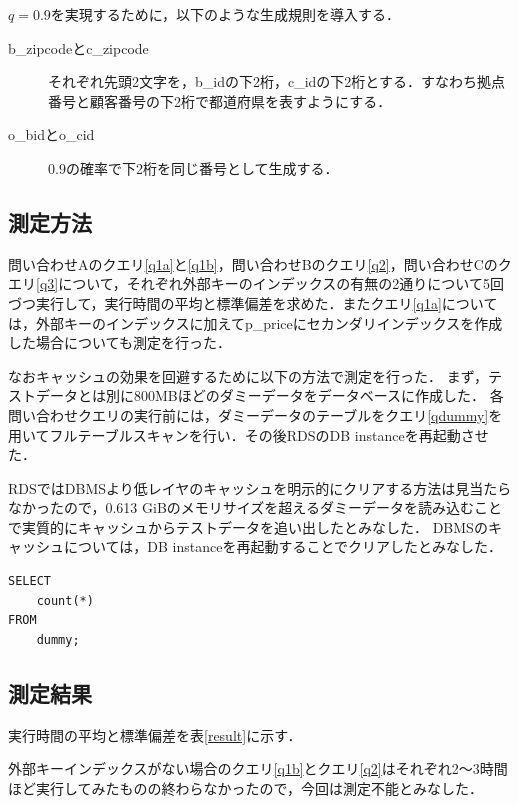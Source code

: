 \documentclass{jsarticle}
\begin{document}
$ q = 0.9 $を実現するために，以下のような生成規則を導入する．
\begin{description}
  \item[b\_zipcodeとc\_zipcode] それぞれ先頭2文字を，b\_idの下2桁，c\_idの下2桁とする．すなわち拠点番号と顧客番号の下2桁で都道府県を表すようにする．
  \item[o\_bidとo\_cid] $ 0.9 $の確率で下2桁を同じ番号として生成する．
\end{description}

\subsection{測定方法}
問い合わせAのクエリ\ref{q1a}と\ref{q1b}，問い合わせBのクエリ\ref{q2}，問い合わせCのクエリ\ref{q3}について，それぞれ外部キーのインデックスの有無の2通りについて5回づつ実行して，実行時間の平均と標準偏差を求めた．またクエリ\ref{q1a}については，外部キーのインデックスに加えてp\_priceにセカンダリインデックスを作成した場合についても測定を行った．

なおキャッシュの効果を回避するために以下の方法で測定を行った．
まず，テストデータとは別に800MBほどのダミーデータをデータベースに作成した．
各問い合わせクエリの実行前には，ダミーデータのテーブルをクエリ\ref{qdummy}を用いてフルテーブルスキャンを行い．その後RDSのDB instanceを再起動させた．

RDSではDBMSより低レイヤのキャッシュを明示的にクリアする方法は見当たらなかったので，0.613 GiBのメモリサイズを超えるダミーデータを読み込むことで実質的にキャッシュからテストデータを追い出したとみなした．
DBMSのキャッシュについては，DB instanceを再起動することでクリアしたとみなした．

\begin{lstlisting}[caption=ダミーデータをフルスキャンする, label=qdummy]
SELECT
    count(*)
FROM
    dummy;
\end{lstlisting}

\subsection{測定結果}
実行時間の平均と標準偏差を表\ref{result}に示す．

外部キーインデックスがない場合のクエリ\ref{q1b}とクエリ\ref{q2}はそれぞれ2〜3時間ほど実行してみたものの終わらなかったので，今回は測定不能とみなした．
\end{document}

